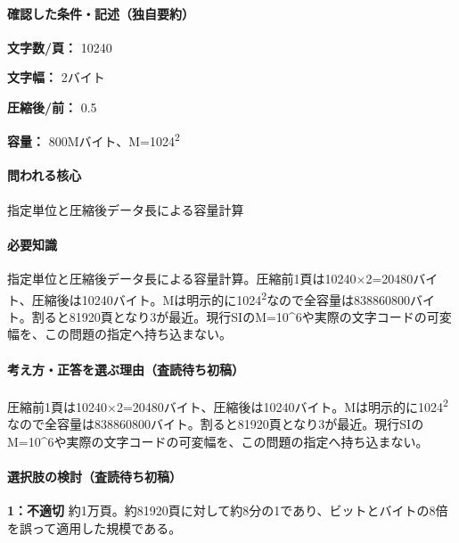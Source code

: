 \paragraph{確認した条件・記述（独自要約）}\mbox{}\par

\noindent\textbf{文字数/頁：} 10240\par

\noindent\textbf{文字幅：} 2バイト\par

\noindent\textbf{圧縮後/前：} 0.5\par

\noindent\textbf{容量：} 800Mバイト、M=\allowbreak{}1024\textsuperscript{2}\par

\paragraph{問われる核心} 指定単位と圧縮後データ長による容量計算

\paragraph{必要知識} 指定単位と圧縮後データ長による容量計算。圧縮前1頁は10240×2=\allowbreak{}20480バイト、圧縮後は10240バイト。Mは明示的に1024\textsuperscript{2}なので全容量は838860800バイト。割ると81920頁となり3が最近。現行SIのM=\allowbreak{}10\textasciicircum{}6や実際の文字コードの可変幅を、この問題の指定へ持ち込まない。

\paragraph{考え方・正答を選ぶ理由（査読待ち初稿）} 圧縮前1頁は10240×2=\allowbreak{}20480バイト、圧縮後は10240バイト。Mは明示的に1024\textsuperscript{2}なので全容量は838860800バイト。割ると81920頁となり3が最近。現行SIのM=\allowbreak{}10\textasciicircum{}6や実際の文字コードの可変幅を、この問題の指定へ持ち込まない。

\paragraph{選択肢の検討（査読待ち初稿）}\mbox{}\par

\noindent\textbf{1：不適切} 約1万頁。約81920頁に対して約8分の1であり、ビットとバイトの8倍を誤って適用した規模である。\par

